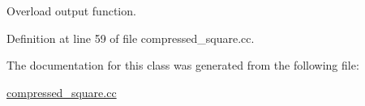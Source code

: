 Overload output function. 



Definition at line 59 of file compressed\+\_\+square.\+cc.



The documentation for this class was generated from the following file\+:\begin{DoxyCompactItemize}
\item 
\hyperlink{compressed__square_8cc}{compressed\+\_\+square.\+cc}\end{DoxyCompactItemize}
